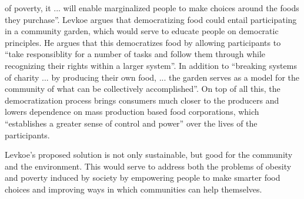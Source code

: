 \documentclass{article}
\begin{document}
of poverty, it ... will enable marginalized people to make choices around the
foods they purchase''. Levkoe argues that democratizing food could entail
participating in a community garden, which would serve to educate people
on democratic principles. He argues that this democratizes food by allowing
participants to ``take responsiblity for a number of tasks and follow them
through while recognizing their rights within a larger system''. In addition to
``breaking systems of charity ... by producing their own food, ... the garden
serves as a model for the community of what can be collectively accomplished''.
On top of all this, the democratization process brings consumers much closer
to the producers and lowers dependence on mass production based food
corporations, which ``establishes a greater sense of control and power''
over the lives of the participants. \par
Levkoe's proposed solution is not only sustainable, but good for the community
and the environment. This would serve to address both the problems of obesity
and poverty induced by society by empowering people to make smarter food choices
and improving ways in which communities can help themselves.
\end{document}
